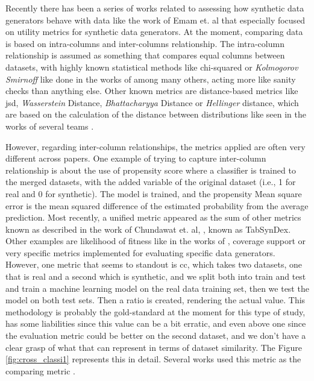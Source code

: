 
Recently there has been a series of works related to assessing how synthetic data generators behave with data like the work of Emam et. al \cite{emamUtilityMetricsEvaluating2022} that especially focused on utility metrics for synthetic data generators. At the moment, comparing data is based on intra-columns and inter-columns relationship. The intra-column relationship is assumed as something that compares equal columns between datasets, with highly known statistical methods like chi-squared or \textit{Kolmogorov Smirnoff} like done in the works of \cite{combrinkComparingSyntheticTabular2022} among many others, acting more like sanity checks than anything else. Other known metrics are distance-based metrics like \acl{jsd}, \textit{Wasserstein} Distance, \textit{Bhattacharyya} Distance or \textit{Hellinger} distance, which are based on the calculation of the distance between distributions like seen in the works of several teams \cite{ISI:000557358500024,choiGeneratingMultilabelDiscrete2017,Baowaly2019}.

However, regarding inter-column relationships, the metrics applied are often very different across papers. One example of trying to capture inter-column relationship is about the use of propensity score \cite{rosenbaumCentralRolePropensity1983,mullerEvaluationSyntheticElectronic2022} where a classifier is trained to the merged datasets, with the added variable of the original dataset (i.e., 1 for real and 0 for synthetic). The model is trained, and the propensity Mean square error is the  mean squared difference of the estimated probability from the average prediction.
Most recently, a unified metric appeared as the sum of other metrics known as described in the work of Chundawat et. al, \cite{chundawatTabSynDexUniversalMetric2022}, known as TabSynDex. Other examples are likelihood of fitness like in the works of \cite{xuModelingTabularData2019b}, coverage support \cite{goncalvesGenerationEvaluationSynthetic2020a} or very specific metrics implemented for evaluating specific data generators.
However, one metric that seems to standout is \ac{cc}, which takes two datasets, one that is real and a second which is synthetic, and we split both into train and test and train a machine learning model on the real data training set, then we test the model on both test sets. Then a ratio is created, rendering the actual value. This methodology is probably the gold-standard at the moment for this type of study, has some liabilities since this value can be a bit erratic, and even above one since the evaluation metric could be better on the second dataset, and we don't have a clear grasp of what that can represent in terms of dataset similarity. The Figure \ref{fig:cross_classi1} represents this in detail. Several works used this metric as the comparing metric \cite{mullerEvaluationSyntheticElectronic2022}.

